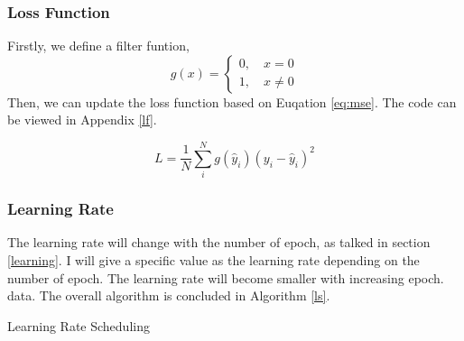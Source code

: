     \subsubsection{Loss Function}
        Firstly, we define a filter funtion,
        \begin{equation}
            g(x)= \begin{cases} 0, \quad x = 0 \\ 1, \quad x \ne 0 \end{cases}
        \end{equation}
        Then, we can update the loss function based on Euqation \ref{eq:mse}. The code can be viewed in Appendix \ref{lf}.

        \begin{equation}
            L = \frac{1}{N}\sum_{i}^{N}g(\hat{y}_i)(y_i-\hat{y}_i)^2
        \end{equation}
    \subsubsection{Learning Rate}
    The learning rate will change with the number of epoch, as talked in section \ref{learning}. I will give a specific value as the learning rate depending on the number of epoch. The learning rate will become smaller with increasing epoch. 
    data. The overall algorithm is concluded in Algorithm \ref{ls}.
    \begin{algorithm}[!h]
        \caption{Learning Rate Scheduling}
        \label{ls}
    \end{algorithm}

